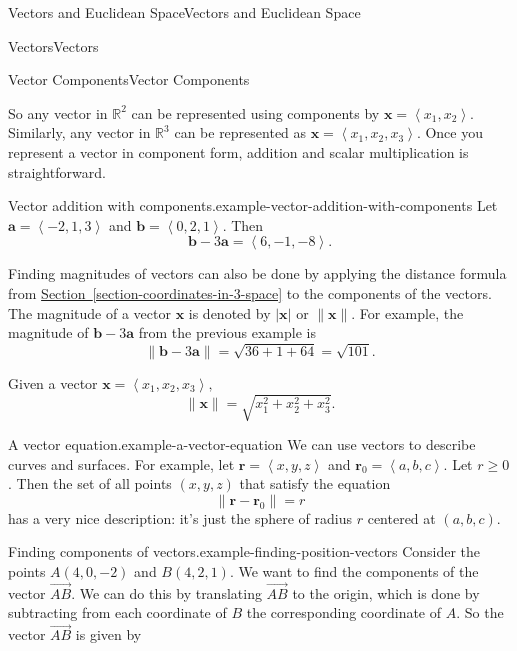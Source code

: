 \documentclass[10pt,]{book}
\numberwithin{equation}{section}
\newcommand{\RR}{\mathbb{R}}
\newcommand{\vv}[1]{\mathbf{#1}}
\newcommand{\dotprod}[1]{\left\langle #1 \right\rangle}
\begin{document}
\begin{chapterptx}{Vectors and Euclidean Space}{}{Vectors and Euclidean Space}{}{}
\begin{sectionptx}{Vectors}{}{Vectors}{}{}
\begin{subsectionptx}{Vector Components}{}{Vector Components}{}{}
\par
\hypertarget{p-873}{}%
So any vector in \(\RR^{2}\) can be represented using components by \(\vv{x} = \dotprod{x_{1},x_{2}}\). Similarly, any vector in \(\RR^{3}\) can be represented as \(\vv{x} = \dotprod{x_{1},x_{2},x_{3}}\). Once you represent a vector in component form, addition and scalar multiplication is straightforward.%
\begin{example}{Vector addition with components.}{example-vector-addition-with-components}%
\hypertarget{p-874}{}%
Let \(\vv{a} = \dotprod{-2,1,3}\) and \(\vv{b} = \dotprod{0,2,1}\). Then%
%
\begin{equation*}
\vv{b}-3\vv{a} = \dotprod{6,-1,-8}.
\end{equation*}
\end{example}
\hypertarget{p-875}{}%
Finding magnitudes of vectors can also be done by applying the distance formula from \hyperref[section-coordinates-in-3-space]{Section~\ref{section-coordinates-in-3-space}} to the components of the vectors. The magnitude of a vector \(\vv{x}\) is denoted by \(|\vv{x}|\) or \(\|\vv{x}\|\). For example, the magnitude of \(\vv{b}-3\vv{a}\) from the previous example is%
\begin{equation*}
\|\vv{b}-3\vv{a}\| = \sqrt{36+1+64} = \sqrt{101}.
\end{equation*}
%
\par
\hypertarget{p-876}{}%
Given a vector \(\vv{x} = \dotprod{x_{1},x_{2},x_{3}},\)%
\begin{equation*}
\|\vv{x}\| = \sqrt{x_{1}^{2}+x_{2}^{2}+x_{3}^{2}}.
\end{equation*}
%
\begin{example}{A vector equation.}{example-a-vector-equation}%
\hypertarget{p-877}{}%
We can use vectors to describe curves and surfaces. For example, let \(\vv{r} = \dotprod{x,y,z}\) and \(\vv{r}_{0} = \dotprod{a,b,c}\). Let \(r\geq0\). Then the set of all points \((x,y,z)\) that satisfy the equation%
%
\begin{equation*}
\|\vv{r}-\vv{r}_{0}\| = r
\end{equation*}
\hypertarget{p-878}{}%
has a very nice description: it's just the sphere of radius \(r\) centered at \((a,b,c)\).%
\end{example}
\begin{example}{Finding components of vectors.}{example-finding-position-vectors}%
\hypertarget{p-879}{}%
Consider the points \(A(4,0,-2)\) and \(B(4,2,1)\). We want to find the components of the vector \(\overrightarrow{AB}\). We can do this by translating \(\overrightarrow{AB}\) to the origin, which is done by subtracting from each coordinate of \(B\) the corresponding coordinate of \(A\). So the vector \(\overrightarrow{AB}\) is given by%

\end{example}
\end{subsectionptx}
\end{sectionptx}
\end{chapterptx}
\end{document}
